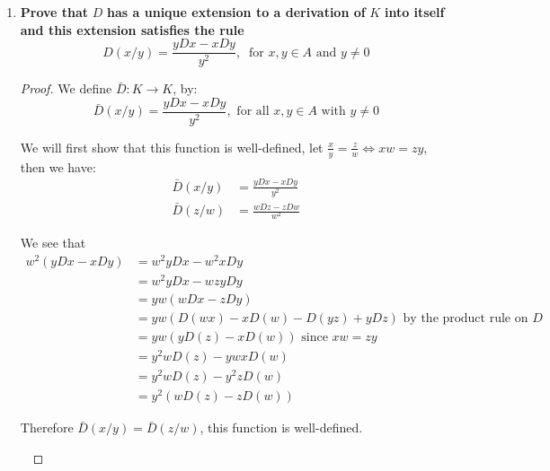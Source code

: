 \documentclass{article}
\theoremstyle{definition}
\theoremstyle{remark}
\theoremstyle{definition}
\begin{document}
\begin{enumerate}[label={(\alph*)}]
    \item \textbf{ Prove that }$D$\textbf{ has a unique extension to a derivation of }$K$\textbf{ into itself and this extension satisfies the rule}\begin{equation}
        D(x/y) = \frac{yDx-xDy}{y^2}, \ \text{ for }x,y\in A\text{ and }y\neq 0
    \end{equation}
    \begin{proof}
        We define $\bar D\colon K\rightarrow K$, by:\begin{equation}
            \bar D(x/y) = \frac{yDx-xDy}{y^2}, \text{ for all }x,y\in A\text{ with }y\neq 0
        \end{equation}

        We will first show that this function is well-defined, let $\frac{x}{y}=\frac{z}{w} \iff xw=zy$, then we have:\begin{align}
            \bar D(x/y) &= \frac{yDx-xDy}{y^2}\\
            \bar D(z/w) &= \frac{wDz-zDw}{w^2}
        \end{align}

        We see that\begin{align}
            w^2(yDx-xDy) &= w^2yDx-w^2xDy\\
                         &= w^2yDx-wzyDy\\
                         &= yw(wDx-zDy)\\
                         &= yw(D(wx) - xD(w) - D(yz) + yDz) \text{ by the product rule on }D\\
                         &= yw(yD(z)-xD(w)) \text{ since }xw=zy\\
                         &= y^2wD(z) - ywxD(w)\\
                         &= y^2wD(z) - y^2zD(w)\\
                         &= y^2(wD(z)-zD(w))
        \end{align}

        Therefore $\bar D(x/y) = \bar D(z/w)$, this function is well-defined.

        \


\end{proof}
\end{enumerate}
\end{document}
